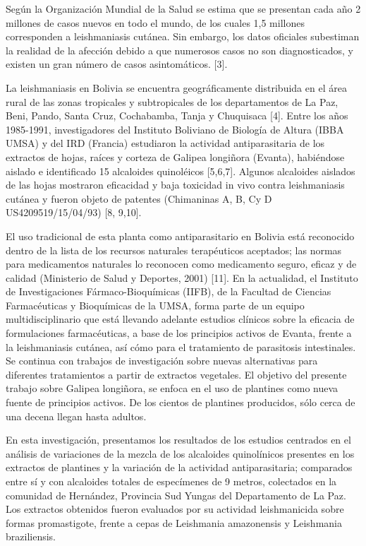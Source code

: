 \documentclass{article}
\begin{document}
Según la Organización Mundial de la Salud se estima que se presentan cada año 2
millones de casos nuevos en todo el mundo, de los cuales 1,5 millones
corresponden a leishmaniasis cutánea. Sin embargo, los datos oficiales
subestiman la realidad de la afección debido a que numerosos casos no son
diagnosticados, y existen un gran número de casos asintomáticos. [3].

La leishmaniasis en Bolivia se encuentra geográficamente distribuida en el área
rural de las zonas tropicales y subtropicales de los departamentos de La Paz,
Beni, Pando, Santa Cruz, Cochabamba, Tanja y Chuquisaca [4]. Entre los años
1985-1991, investigadores del Instituto Boliviano de Biología de Altura (IBBA
UMSA) y del IRD (Francia) estudiaron la actividad antiparasitaria de los
extractos de hojas, raíces y corteza de Galipea longiñora (Evanta), habiéndose
aislado e identificado 15 alcaloides quinoléicos [5,6,7]. Algunos alcaloides
aislados de las hojas mostraron eficacidad y baja toxicidad in vivo contra
leishmaniasis cutánea y fueron objeto de patentes (Chimaninas A, B, Cy D
US4209519/15/04/93) [8, 9,10].

El uso tradicional de esta planta como antiparasitario en Bolivia está
reconocido dentro de la lista de los recursos naturales terapéuticos aceptados;
las normas para medicamentos naturales lo reconocen como medicamento seguro,
eficaz y de calidad (Ministerio de Salud y Deportes, 2001) [11]. En la
actualidad, el Instituto de Investigaciones Fármaco-Bioquímicas (IIFB), de la
Facultad de Ciencias Farmacéuticas y Bioquímicas de la UMSA, forma parte de un
equipo multidisciplinario que está llevando adelante estudios clínicos sobre la
eficacia de formulaciones farmacéuticas, a base de los principios activos de
Evanta, frente a la leishmaniasis cutánea, así cómo para el tratamiento de
parasitosis intestinales. Se continua con trabajos de investigación sobre nuevas
alternativas para diferentes tratamientos a partir de extractos vegetales. El
objetivo del presente trabajo sobre Galipea longiñora, se enfoca en el uso de
plantines como nueva fuente de principios activos. De los cientos de plantines
producidos, sólo cerca de una decena llegan hasta adultos.

En esta investigación, presentamos los resultados de los estudios centrados en
el análisis de variaciones de la mezcla de los alcaloides quinolínicos presentes
en los extractos de plantines y la variación de la actividad antiparasitaria;
comparados entre sí y con alcaloides totales de especímenes de 9 metros,
colectados en la comunidad de Hernández, Provincia Sud Yungas del Departamento
de La Paz. Los extractos obtenidos fueron evaluados por su actividad
leishmanicida sobre formas promastigote, frente a cepas de Leishmania
amazonensis y Leishmania braziliensis.
\end{document}
